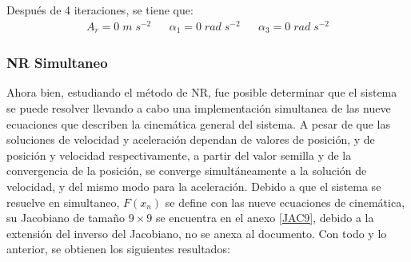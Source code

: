 \documentclass[12pt]{article}
\begin{document}
\vspace{-10pt}
Después de 4 iteraciones, se tiene que:
\vspace{-5pt}
\begin{align*}
A_r=0\;m\;s^{-2}&&\alpha_1=0\;rad\;s^{-2}&&\alpha_3=0\;rad\;s^{-2}
\end{align*}
\vspace{-35pt}
\subsubsection{NR Simultaneo}\label{SecNRS}
Ahora bien, estudiando el método de NR, fue posible determinar que el sistema se puede resolver llevando a cabo una implementación simultanea de las nueve ecuaciones que describen la cinemática general del sistema. A pesar de que las soluciones de velocidad y aceleración dependan de valores de posición, y de posición y velocidad respectivamente, a partir del valor semilla y de la convergencia de la posición, se converge simultáneamente a la solución de velocidad, y del mismo modo para la aceleración. Debido a que el sistema se resuelve en simultaneo, $F(x_n)$ se define con las nueve ecuaciones de cinemática, su Jacobiano de tamaño $9\times9$ se encuentra en el anexo \ref{JAC9}, debido a la extensión del inverso del Jacobiano, no se anexa al documento. Con todo y lo anterior, se obtienen los siguientes resultados:
\vspace{-10pt}
\end{document}
